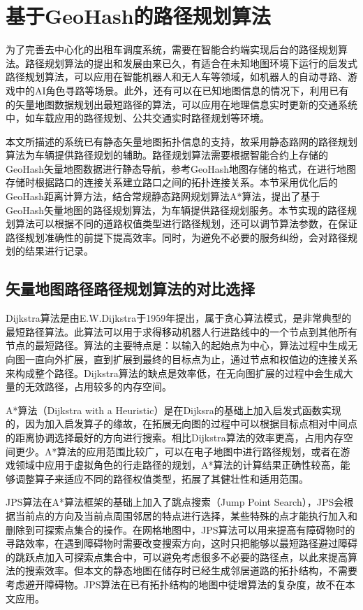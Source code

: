 \section{基于GeoHash的路径规划算法}
为了完善去中心化的出租车调度系统，需要在智能合约端实现后台的路径规划算法。路径规划算法的提出和发展由来已久，有适合在未知地图环境下运行的启发式路径规划算法，可以应用在智能机器人和无人车等领域，如机器人的自动寻路、游戏中的AI角色寻路等场景。此外，还有可以在已知地图信息的情况下，利用已有的矢量地图数据规划出最短路径的算法，可以应用在地理信息实时更新的交通系统中，如车载应用的路径规划、公共交通实时路径规划等环境。\par

本文所描述的系统已有静态矢量地图拓扑信息的支持，故采用静态路网的路径规划算法为车辆提供路径规划的辅助。路径规划算法需要根据智能合约上存储的GeoHash矢量地图数据进行静态导航，参考GeoHash地图存储的格式，在进行地图存储时根据路口的连接关系建立路口之间的拓扑连接关系。本节采用优化后的GeoHash距离计算方法，结合常规静态路网规划算法A*算法，提出了基于GeoHash矢量地图的路径规划算法，为车辆提供路径规划服务。本节实现的路径规划算法可以根据不同的道路权值类型进行路径规划，还可以调节算法参数，在保证路径规划准确性的前提下提高效率。同时，为避免不必要的服务纠纷，会对路径规划的结果进行记录。\par

\subsection{矢量地图路径路径规划算法的对比选择}

Dijkstra算法是由E.W.Dijkstra于1959年提出，属于贪心算法模式，是非常典型的最短路径算法。此算法可以用于求得移动机器人行进路线中的一个节点到其他所有节点的最短路径。算法的主要特点是：以输入的起始点为中心，算法过程中生成无向图一直向外扩展，直到扩展到最终的目标点为止，通过节点和权值边的连接关系来构成整个路径。Dijkstra算法的缺点是效率低，在无向图扩展的过程中会生成大量的无效路径，占用较多的内存空间。\par

A*算法（Dijkstra with a Heuristic）是在Dijksra的基础上加入启发式函数实现的，因为加入启发算子的缘故，在拓展无向图的过程中可以根据目标点相对中间点的距离协调选择最好的方向进行搜索。相比Dijkstra算法的效率更高，占用内存空间更少。A*算法的应用范围比较广，可以在电子地图中进行路径规划，或者在游戏领域中应用于虚拟角色的行走路径的规划，A*算法的计算结果正确性较高，能够调整算子来适应不同的路径权值类型，拓展了其健壮性和适用范围。\par

JPS算法在A*算法框架的基础上加入了跳点搜索（Jump Point Search），JPS会根据当前点的方向及当前点周围邻居的特点进行选择，某些特殊的点才能执行加入和删除到可探索点集合的操作。在网格地图中，JPS算法可以用来提高有障碍物时的寻路效率，在遇到障碍物时需要改变搜索方向，这时只把能够以最短路径避过障碍的跳跃点加入可探索点集合中，可以避免考虑很多不必要的路径点，以此来提高算法的搜索效率。但本文的静态地图在储存时已经生成邻居道路的拓扑结构，不需要考虑避开障碍物。JPS算法在已有拓扑结构的地图中徒增算法的复杂度，故不在本文应用。\par

